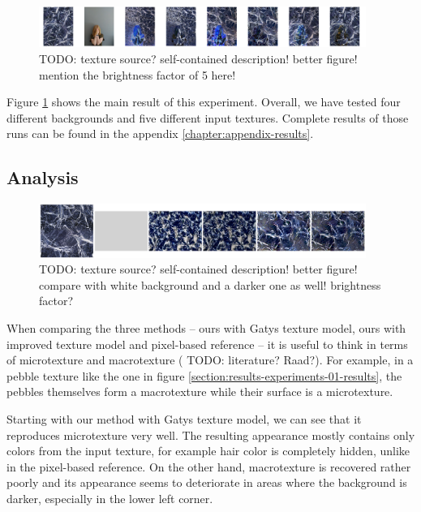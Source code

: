 \begin{figure}[ht]
    \begin{center}
        \includegraphics[width=0.95\textwidth]{images/ex02-crop.png}
        \caption{{\color{red} TODO: texture source? self-contained description! better figure! mention the brightness factor of 5 here!}}
        \label{fig:ex02}
    \end{center}
\end{figure}

Figure \ref{fig:ex02} shows the main result of this experiment. Overall, we have tested four different backgrounds and five different input textures. Complete results of those runs can be found in the appendix \ref{chapter:appendix-results}.

\subsection{Analysis}
\label{section:results-experiments-02-analysis}

\begin{figure}[ht]
    \begin{center}
        \includegraphics[width=0.95\textwidth]{images/ex02-isolating_issues-crop.png}
        \caption{{\color{red} TODO: texture source? self-contained description! better figure! compare with white background and a darker one as well! brightness factor?}}
        \label{fig:ex02-issues}
    \end{center}
\end{figure}

When comparing the three methods -- ours with Gatys texture model, ours with improved texture model and pixel-based reference -- it is useful to think in terms of microtexture and macrotexture ({\color{red} TODO: literature? Raad?}). For example, in a pebble texture like the one in figure \ref{section:results-experiments-01-results}, the pebbles themselves form a macrotexture while their surface is a microtexture.

Starting with our method with Gatys texture model, we can see that it reproduces microtexture very well. The resulting appearance mostly contains only colors from the input texture, for example hair color is completely hidden, unlike in the pixel-based reference. On the other hand, macrotexture is recovered rather poorly and its appearance seems to deteriorate in areas where the background is darker, especially in the lower left corner.

